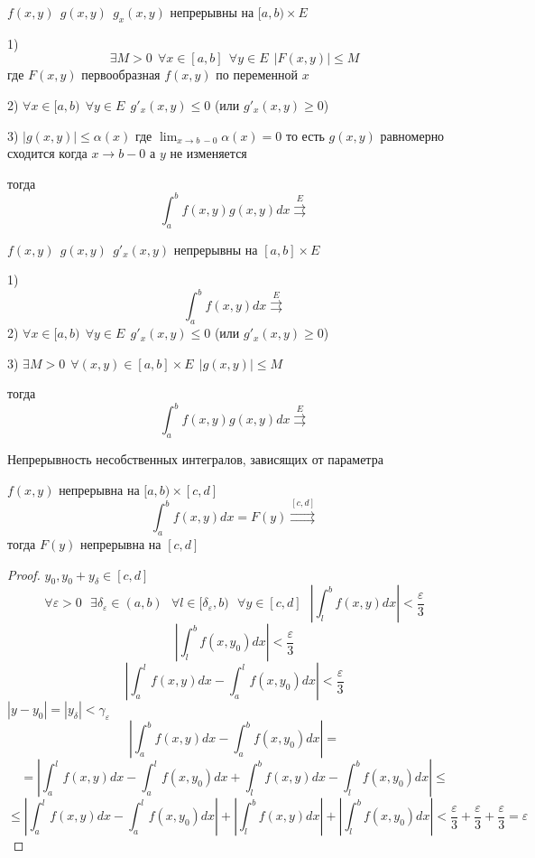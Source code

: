 \begin{block}
  $f(x,y) ~~ g(x,y) ~~ g_x(x,y)$ непрерывны на $[a,b) \times E$

  1)
  $$
  \exists M > 0
  ~~
  \forall x \in [a, b]
  ~~
  \forall y \in E
  ~~
  | F(x, y)| \le M
  $$
  где $F(x,y)$ первообразная $f(x,y)$ по переменной $x$

  2) $\forall x \in [a,b) ~~ \forall y \in E ~~ g'_x(x,y) \le 0$ (или
  $g'_x(x,y) \ge 0$)

  3) $|g(x,y)| \le \alpha(x)$ где $\lim_{x \to b ~ -0} \alpha(x) = 0$ то есть
  $g(x,y)$ равномерно сходится когда $x \to b -0$ а $y$ не изменяется

  тогда
  $$
  \int_a^b f(x,y) g(x,y) dx \stackrel{E}{\rightrightarrows}
  $$
\end{block}

\begin{block}
  $f(x,y) ~~ g(x,y) ~~ g'_x(x,y)$ непрерывны на $[a,b] \times E$

  1)
  $$
  \int_a^b f(x,y) dx \stackrel{E}{\rightrightarrows}
  $$
  2) $\forall x \in [a,b) ~~ \forall y \in E ~~ g'_x(x,y) \le 0$ (или
  $g'_x(x,y) \ge 0$)

  3) $\exists M > 0 ~~ \forall (x,y) \in [a,b] \times E ~~ |g(x,y)| \le M$

  тогда
  $$
  \int_a^b f(x,y) g(x,y) dx \stackrel{E}{\rightrightarrows}
  $$
\end{block}

\begin{title}[\Large]
  Непрерывность несобственных интегралов, зависящих от параметра
\end{title}

\begin{theorem}
  $f(x,y)$ непрерывна на $[a,b) \times [c, d]$
  $$
  \int_a^b f(x,y) dx = F(y) \stackrel{[c,d]}{\rightrightarrows}
  $$
 тогда $F(y)$ непрерывна на $[c,d]$
\end{theorem}

\begin{proof}
  $y_0, y_0 + y_{\delta} \in [c, d]$
  $$
  \forall \varepsilon > 0
  ~~~
  \exists \delta_{\varepsilon} \in (a,b)
  ~~~
  \forall l \in [\delta_{\varepsilon}, b)
  ~~~
  \forall y \in [c, d]
  ~~~
  \left|
    \int_l^b f(x,y)dx
  \right|
  < \frac{\varepsilon}{3}
  $$
  $$
  \left|
    \int_l^b f(x,y_0)dx
  \right|
  < \frac{\varepsilon}{3}
  $$
  $$
  \left|
    \int_a^l f(x,y)dx
    -
    \int_a^l f(x,y_0)dx
  \right|
  < \frac{\varepsilon}{3}
  $$
  $|y - y_0| = |y_{\delta}| < \gamma_{\varepsilon}$
  $$
  \left|
    \int_a^b f(x,y)dx
    -
    \int_a^b f(x,y_0)dx
  \right|
  =
  $$
  $$
  =
  \left|
    \int_a^l f(x,y)dx
    -
    \int_a^l f(x,y_0)dx
    +
    \int_l^b f(x,y)dx
    -
    \int_l^b f(x,y_0)dx
  \right|
  \le
  $$
  $$
  \le
  \left|
    \int_a^l f(x,y)dx
    -
    \int_a^l f(x,y_0)dx
  \right|
  +
  \left|
    \int_l^b f(x,y)dx
  \right|
  +
  \left|
    \int_l^b f(x,y_0)dx
  \right|
  <
    \frac{\varepsilon}{3}
    +
    \frac{\varepsilon}{3}
    +
    \frac{\varepsilon}{3}
  =
    \varepsilon
  $$
\end{proof}

